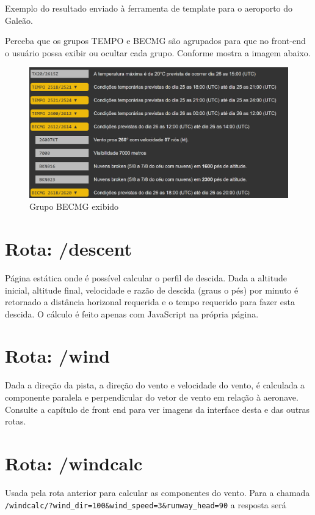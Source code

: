 Exemplo do resultado enviado à ferramenta de template para o aeroporto do Galeão.




Perceba que os grupos TEMPO e BECMG são agrupados para que no front-end o usuário 
possa exibir ou ocultar cada grupo. Conforme mostra a imagem abaixo.


\begin{figure}[ht]
    \begin{center}
    \includegraphics[width=400pt]{img/BECMG-exibido.png}
    \caption{Grupo BECMG exibido}
    \label{fig:becmg-exibido}
    \end{center}
\end{figure}

\section{Rota: /descent}

Página estática onde é possível calcular o perfil de descida. Dada a altitude
inicial, altitude final, velocidade e razão de descida (graus o pés) por minuto
é retornado a distância horizonal requerida e o tempo requerido para fazer esta
descida. O cálculo é feito apenas com JavaScript na própria página.

\section{Rota: /wind}
Dada a direção da pista, a direção do vento e velocidade do vento, é calculada
a componente paralela e perpendicular do vetor de vento em relação à aeronave.
Consulte a capítulo de front end para ver imagens da interface desta e das outras
rotas.

\section{Rota: /windcalc}
Usada pela rota anterior para calcular as componentes do vento. Para a chamada
\verb|/windcalc/?wind_dir=100&wind_speed=3&runway_head=90| a resposta será

